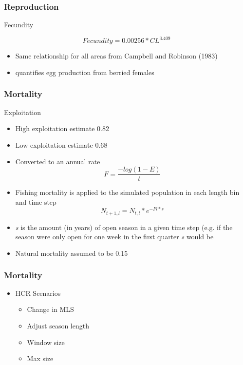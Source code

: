 \documentclass{beamer}
\begin{document}
\begin{frame}
\frametitle{Reproduction}
Fecundity

\begin{equation*}
Fecundity = 0.00256 * CL^{3.409}
\end{equation*}

\begin{itemize}
\item Same relationship for all areas from Campbell and Robinson (1983)
\item quantifies egg production from berried females
\end{itemize}
\end{frame}




\begin{frame}
\frametitle{Mortality}
Exploitation
\begin{itemize}
\item High exploitation estimate 0.82 
\item Low exploitation estimate 0.68 
\item Converted to an annual rate 
\begin{equation*}
F = \frac{-log(1-E)}{t}
\end{equation*}
\item Fishing mortality is applied to the simulated population in each length bin and time step
\begin{equation*}
N_{t+1, l} =  N_{t, l} * e^{-Fl * s}
\end{equation*}
\item \textit{s} is the amount (in years) of open season in a given time step (e.g. if the season were only open for one week in the first quarter \textit{s} would be %
\item Natural mortality assumed to be 0.15
\end{itemize}
\end{frame}



\begin{frame}
\frametitle{Mortality}
\begin{itemize}
\item HCR Scenarios
\begin{itemize}
\item Change in MLS
\item Adjust season length
\item Window size
\item Max size
\end{itemize}

\end{itemize}
\end{frame}
\end{document}

